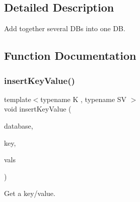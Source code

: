 \subsection{Detailed Description}
Add together several DB\textquotesingle{}s into one DB. 



\subsection{Function Documentation}
\mbox{\label{adat-devel_2main_2dbutil_2dbavgcors_8cc_a8dcef9d29a9dfc5045f4ee378e94fca3}} 
\subsubsection{\texorpdfstring{insertKeyValue()}{insertKeyValue()}}
{\footnotesize\ttfamily template$<$typename K , typename SV $>$ \\
void insert\+Key\+Value (\begin{DoxyParamCaption}\item[{\mbox{\hyperlink{classFILEDB_1_1AllConfStoreDB}{All\+Conf\+Store\+DB}}$<$ \mbox{\hyperlink{classADATIO_1_1SerialDBKey}{Serial\+D\+B\+Key}}$<$ K $>$, \mbox{\hyperlink{classADATIO_1_1SerialDBData}{Serial\+D\+B\+Data}}$<$ SV $>$ $>$ \&}]{database,  }\item[{\mbox{\hyperlink{classADATIO_1_1SerialDBKey}{Serial\+D\+B\+Key}}$<$ K $>$ \&}]{key,  }\item[{std\+::vector$<$ \mbox{\hyperlink{classADATIO_1_1SerialDBData}{Serial\+D\+B\+Data}}$<$ SV $>$ $>$ \&}]{vals }\end{DoxyParamCaption})}



Get a key/value. 

